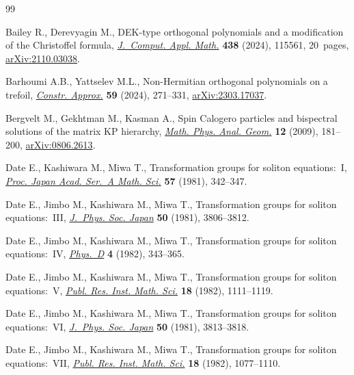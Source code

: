 \documentclass[10pt,a4paper]{amsart}
\numberwithin{equation}{section}
\theoremstyle{definition}
\begin{document}
\begin{thebibliography}{99}
\footnotesize\itemsep=0pt

Bailey R., Derevyagin M., D{EK}-type orthogonal polynomials and a modification
 of the {C}hristoffel formula,
 \href{https://doi.org/10.1016/j.cam.2023.115561}{\textit{J.~Comput. Appl.
 Math.}} \textbf{438} (2024), 115561, 20~pages,
 \href{http://arxiv.org/abs/2110.03038}{arXiv:2110.03038}.

Barhoumi A.B., Yattselev M.L., Non-{H}ermitian orthogonal polynomials on a
 trefoil, \href{https://doi.org/10.1007/s00365-023-09640-6}{\textit{Constr.
 Approx.}} \textbf{59} (2024), 271--331,
 \href{http://arxiv.org/abs/2303.17037}{arXiv:2303.17037}.

Bergvelt M., Gekhtman M., Kasman A., Spin {C}alogero particles and bispectral
 solutions of the matrix {KP} hierarchy,
 \href{https://doi.org/10.1007/s11040-009-9058-y}{\textit{Math. Phys. Anal.
 Geom.}} \textbf{12} (2009), 181--200,
 \href{http://arxiv.org/abs/0806.2613}{arXiv:0806.2613}.

Date E., Kashiwara M., Miwa T., Transformation groups for soliton
 equations:~{I}, \href{https://doi.org/10.3792/pjaa.57.342}{\textit{Proc.
 Japan Acad. Ser.~A Math. Sci.}} \textbf{57} (1981), 342--347.

Date E., Jimbo M., Kashiwara M., Miwa T., Transformation groups for soliton
 equations:~{III},
 \href{https://doi.org/10.1143/JPSJ.50.3806}{\textit{J.~Phys. Soc. Japan}}
 \textbf{50} (1981), 3806--3812.

Date E., Jimbo M., Kashiwara M., Miwa T., Transformation groups for soliton
 equations:~{IV},
 \href{https://doi.org/10.1016/0167-2789(82)90041-0}{\textit{Phys.~D}}
 \textbf{4} (1982), 343--365.

Date E., Jimbo M., Kashiwara M., Miwa T., Transformation groups for soliton
 equations:~{V}, \href{https://doi.org/10.2977/prims/1195183298}{\textit{Publ.
 Res. Inst. Math. Sci.}} \textbf{18} (1982), 1111--1119.

Date E., Jimbo M., Kashiwara M., Miwa T., Transformation groups for soliton
 equations:~{VI}, \href{https://doi.org/10.1143/JPSJ.50.3813}{\textit{J.~Phys.
 Soc. Japan}} \textbf{50} (1981), 3813--3818.

Date E., Jimbo M., Kashiwara M., Miwa T., Transformation groups for soliton
 equations:~{VII},
 \href{https://doi.org/10.2977/PRIMS/1195183297}{\textit{Publ. Res. Inst.
 Math. Sci.}} \textbf{18} (1982), 1077--1110.


\end{thebibliography}
\end{document}
